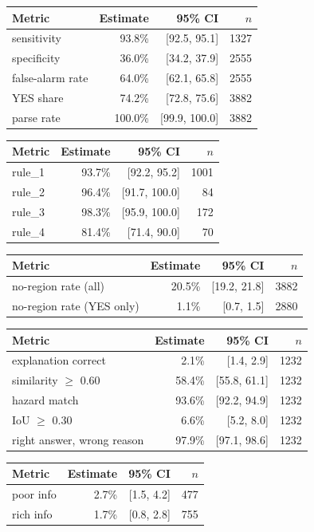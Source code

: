 \begin{tabular}{lrrr}
\toprule
Metric & Estimate & 95\% CI & $n$ \\
\midrule
sensitivity & 93.8\% & [92.5, 95.1] & 1327 \\
specificity & 36.0\% & [34.2, 37.9] & 2555 \\
false-alarm rate & 64.0\% & [62.1, 65.8] & 2555 \\
YES share & 74.2\% & [72.8, 75.6] & 3882 \\
parse rate & 100.0\% & [99.9, 100.0] & 3882 \\
\bottomrule
\end{tabular}

\begin{tabular}{lrrr}
\toprule
Metric & Estimate & 95\% CI & $n$ \\
\midrule
rule\_1 & 93.7\% & [92.2, 95.2] & 1001 \\
rule\_2 & 96.4\% & [91.7, 100.0] & 84 \\
rule\_3 & 98.3\% & [95.9, 100.0] & 172 \\
rule\_4 & 81.4\% & [71.4, 90.0] & 70 \\
\bottomrule
\end{tabular}

\begin{tabular}{lrrr}
\toprule
Metric & Estimate & 95\% CI & $n$ \\
\midrule
no-region rate (all) & 20.5\% & [19.2, 21.8] & 3882 \\
no-region rate (YES only) & 1.1\% & [0.7, 1.5] & 2880 \\
\bottomrule
\end{tabular}

\begin{tabular}{lrrr}
\toprule
Metric & Estimate & 95\% CI & $n$ \\
\midrule
explanation correct & 2.1\% & [1.4, 2.9] & 1232 \\
similarity $\geq$ 0.60 & 58.4\% & [55.8, 61.1] & 1232 \\
hazard match & 93.6\% & [92.2, 94.9] & 1232 \\
IoU $\geq$ 0.30 & 6.6\% & [5.2, 8.0] & 1232 \\
right answer, wrong reason & 97.9\% & [97.1, 98.6] & 1232 \\
\bottomrule
\end{tabular}

\begin{tabular}{lrrr}
\toprule
Metric & Estimate & 95\% CI & $n$ \\
\midrule
poor info & 2.7\% & [1.5, 4.2] & 477 \\
rich info & 1.7\% & [0.8, 2.8] & 755 \\
\bottomrule
\end{tabular}

